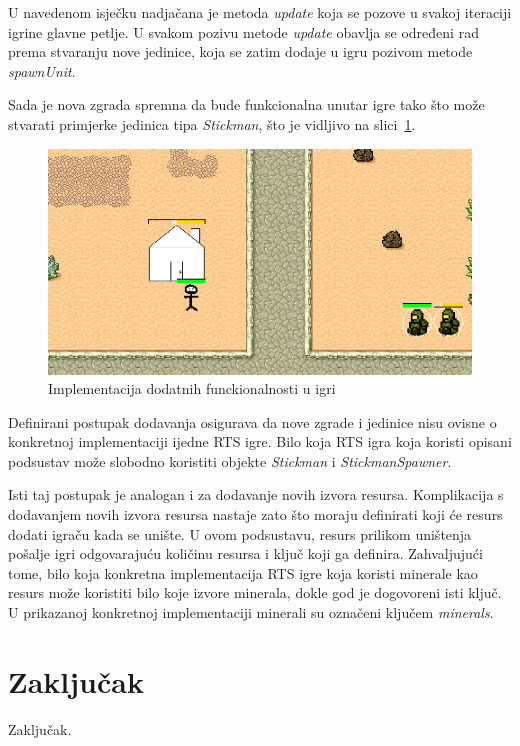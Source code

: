 \documentclass[times, utf8, zavrsni, numeric]{fer}
\begin{document}
\par U navedenom isječku nadjačana je metoda \textit{update} koja se pozove u svakoj iteraciji igrine glavne petlje.
U svakom pozivu metode \textit{update} obavlja se određeni rad prema stvaranju nove jedinice, koja se zatim dodaje u igru pozivom metode \textit{spawnUnit}.

\par Sada je nova zgrada spremna da bude funkcionalna unutar igre tako što može stvarati primjerke jedinica tipa \textit{Stickman}, što je vidljivo na slici~\ref{fig:stickman}.

\begin{figure}[h]
	\centering
	\includegraphics[width=0.7\linewidth]{images/stickman.png}
	\caption{Implementacija dodatnih funckionalnosti u igri}
	\label{fig:stickman}
\end{figure}

\par Definirani postupak dodavanja osigurava da nove zgrade i jedinice nisu ovisne o konkretnoj implementaciji ijedne RTS igre.
Bilo koja RTS igra koja koristi opisani podsustav može slobodno koristiti objekte \textit{Stickman} i \textit{StickmanSpawner}.

\par Isti taj postupak je analogan i za dodavanje novih izvora resursa.
Komplikacija s dodavanjem novih izvora resursa nastaje zato što moraju definirati koji će resurs dodati igraču kada se unište.
U ovom podsustavu, resurs prilikom uništenja pošalje igri odgovarajuću količinu resursa i ključ koji ga definira.
Zahvaljujući tome, bilo koja konkretna implementacija RTS igre koja koristi minerale kao resurs može koristiti bilo koje izvore minerala, dokle god je dogovoreni isti ključ.
U prikazanoj konkretnoj implementaciji minerali su označeni ključem \textit{minerals}.

\chapter{Zaključak}\label{ch:conclusion}
Zaključak.
\end{document}
